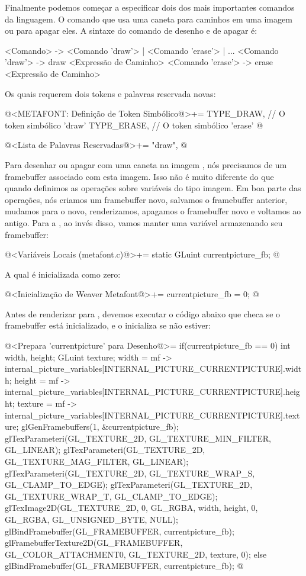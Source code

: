 {

Finalmente podemos começar a especificar dois dos mais importantes
comandos da linguagem. O comando que usa uma caneta para caminhos em
uma imagem ou para apagar eles. A sintaxe do comando de desenho e de
apagar é:

\alinhaverbatim
<Comando> -> <Comando 'draw'> | <Comando 'erase'> | ...
<Comando 'draw'> -> draw <Expressão de Caminho>
<Comando 'erase'> -> erase <Expressão de Caminho>
\alinhanormal

Os quais requerem dois tokens e palavras reservada novas:

\iniciocodigo
@<METAFONT: Definição de Token Simbólico@>+=
TYPE_DRAW,   // O token simbólico 'draw'
TYPE_ERASE,  // O token simbólico 'erase'
@
\fimcodigo

\iniciocodigo
@<Lista de Palavras Reservadas@>+=
"draw",
@
\fimcodigo


Para desenhar ou apagar com uma caneta na
imagem , nós precisamos de um framebuffer
associado com esta imagem. Isso não é muito diferente do que quando
definimos as operações sobre variáveis do tipo imagem. Em boa parte
das operações, nós criamos um framebuffer novo, salvamos o framebuffer
anterior, mudamos para o novo, renderizamos, apagamos o framebuffer
novo e voltamos ao antigo. Para a , ao
invés disso, vamos manter uma variável armazenando seu framebuffer:

\iniciocodigo
@<Variáveis Locais (metafont.c)@>+=
static GLuint currentpicture_fb;
@
\fimcodigo

A qual é inicializada como zero:

\iniciocodigo
@<Inicialização de Weaver Metafont@>+=
currentpicture_fb = 0;
@
\fimcodigo

Antes de renderizar para , devemos executar
o código abaixo que checa se o framebuffer está inicializado, e o
inicializa se não estiver:

\iniciocodigo
@<Prepara 'currentpicture' para Desenho@>=
{
  if(currentpicture_fb == 0){
    int width, height;
    GLuint texture;
    width = mf ->
             internal_picture_variables[INTERNAL_PICTURE_CURRENTPICTURE].width;
    height = mf ->
            internal_picture_variables[INTERNAL_PICTURE_CURRENTPICTURE].height;
    texture = mf ->
           internal_picture_variables[INTERNAL_PICTURE_CURRENTPICTURE].texture;
    glGenFramebuffers(1, &currentpicture_fb);
    glTexParameteri(GL_TEXTURE_2D, GL_TEXTURE_MIN_FILTER, GL_LINEAR);
    glTexParameteri(GL_TEXTURE_2D, GL_TEXTURE_MAG_FILTER, GL_LINEAR);
    glTexParameteri(GL_TEXTURE_2D, GL_TEXTURE_WRAP_S, GL_CLAMP_TO_EDGE);
    glTexParameteri(GL_TEXTURE_2D, GL_TEXTURE_WRAP_T, GL_CLAMP_TO_EDGE);
    glTexImage2D(GL_TEXTURE_2D, 0, GL_RGBA, width, height, 0, GL_RGBA,
                 GL_UNSIGNED_BYTE, NULL);
    glBindFramebuffer(GL_FRAMEBUFFER, currentpicture_fb);
    glFramebufferTexture2D(GL_FRAMEBUFFER, GL_COLOR_ATTACHMENT0, GL_TEXTURE_2D,
                           texture, 0);
  }
  else
    glBindFramebuffer(GL_FRAMEBUFFER, currentpicture_fb);
}
@
\fimcodigo

}
